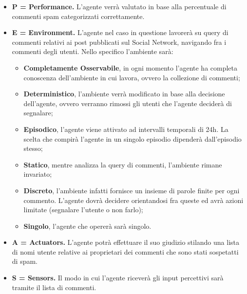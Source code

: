 \documentclass{report}
\begin{document}
    \begin{itemize}
        \item 
        {\bfseries P = Performance.} 
        L'agente verrà valutato in base alla percentuale di commenti spam categorizzati correttamente.
        \item 
        {\bfseries E = Environment.} L'agente nel caso in questione lavorerà su query di commenti relativi ai post pubblicati sul Social Network, 
        navigando fra i commenti degli utenti.\newline
        Nello specifico l'ambiente sarà:
            \begin{itemize}
                \item {\bfseries Completamente Osservabile}, in ogni momento l'agente ha completa conoscenza
                dell'ambiente in cui lavora, ovvero la collezione di commenti;
                \item {\bfseries Deterministico}, l'ambiente verrà modificato in base alla decisione dell'agente, 
                ovvero verranno rimossi gli utenti che l'agente deciderà di segnalare;
                \item {\bfseries Episodico}, l'agente viene attivato ad intervalli temporali di 24h. La scelta che compirà l'agente in un singolo episodio dipenderà dall'episodio stesso;
                \item {\bfseries Statico}, mentre analizza la query di commenti, l'ambiente rimane invariato;
                \item {\bfseries Discreto}, l'ambiente infatti fornisce un insieme di parole finite per ogni commento. L'agente
                dovrà decidere orientandosi fra queste ed avrà azioni limitate (segnalare l'utente o non farlo); 
                \item {\bfseries Singolo}, l'agente che opererà sarà singolo.
            \end{itemize}
          
        \item 
        {\bfseries A = Actuators.} L'agente potrà effettuare il suo giudizio stilando una lista di nomi utente relative ai proprietari dei commenti che sono stati sospetatti di spam.
        \item 
        {\bfseries S = Sensors.} Il modo in cui l'agente riceverà gli input percettivi sarà tramite il lista di commenti.
        
    \end{itemize}
    
\end{document}
